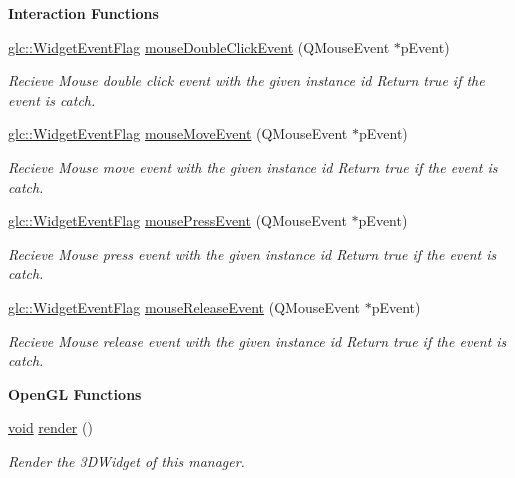 \begin{Indent}{\bf Interaction Functions}\par
\begin{DoxyCompactItemize}
\item 
\hyperlink{namespaceglc_a7a4a1e3955352aeb2d018746fbe626d5}{glc\-::\-Widget\-Event\-Flag} \hyperlink{class_g_l_c__3_d_widget_manager_a02b4292a8964df56653626569c1da6c9}{mouse\-Double\-Click\-Event} (Q\-Mouse\-Event $\ast$p\-Event)
\begin{DoxyCompactList}\small\item\em Recieve Mouse double click event with the given instance id Return true if the event is catch. \end{DoxyCompactList}\item 
\hyperlink{namespaceglc_a7a4a1e3955352aeb2d018746fbe626d5}{glc\-::\-Widget\-Event\-Flag} \hyperlink{class_g_l_c__3_d_widget_manager_ac874339989a571e301c8f839c5efc71c}{mouse\-Move\-Event} (Q\-Mouse\-Event $\ast$p\-Event)
\begin{DoxyCompactList}\small\item\em Recieve Mouse move event with the given instance id Return true if the event is catch. \end{DoxyCompactList}\item 
\hyperlink{namespaceglc_a7a4a1e3955352aeb2d018746fbe626d5}{glc\-::\-Widget\-Event\-Flag} \hyperlink{class_g_l_c__3_d_widget_manager_a20ee1046acd3acac65da566813abdcf2}{mouse\-Press\-Event} (Q\-Mouse\-Event $\ast$p\-Event)
\begin{DoxyCompactList}\small\item\em Recieve Mouse press event with the given instance id Return true if the event is catch. \end{DoxyCompactList}\item 
\hyperlink{namespaceglc_a7a4a1e3955352aeb2d018746fbe626d5}{glc\-::\-Widget\-Event\-Flag} \hyperlink{class_g_l_c__3_d_widget_manager_aee2e2f02b1f0d29b5404e2a9ba0d1755}{mouse\-Release\-Event} (Q\-Mouse\-Event $\ast$p\-Event)
\begin{DoxyCompactList}\small\item\em Recieve Mouse release event with the given instance id Return true if the event is catch. \end{DoxyCompactList}\end{DoxyCompactItemize}
\end{Indent}
\begin{Indent}{\bf Open\-G\-L Functions}\par
\begin{DoxyCompactItemize}
\item 
\hyperlink{group___u_a_v_objects_plugin_ga444cf2ff3f0ecbe028adce838d373f5c}{void} \hyperlink{class_g_l_c__3_d_widget_manager_a44093c34ac539b220a428548d2cd3012}{render} ()
\begin{DoxyCompactList}\small\item\em Render the 3\-D\-Widget of this manager. \end{DoxyCompactList}\end{DoxyCompactItemize}
\end{Indent}



